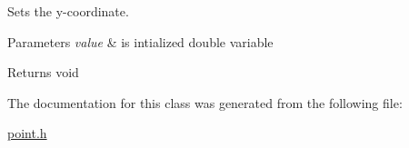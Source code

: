 Sets the y-\/coordinate. 


\begin{DoxyParams}{Parameters}
{\em value} & is intialized double variable \\
\hline
\end{DoxyParams}
\begin{DoxyReturn}{Returns}
void 
\end{DoxyReturn}


The documentation for this class was generated from the following file\+:\begin{DoxyCompactItemize}
\item 
\hyperlink{point_8h}{point.\+h}\end{DoxyCompactItemize}
